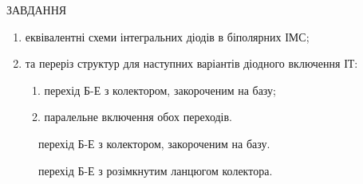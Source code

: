 \documentclass[a4paper,14pt]{extreport}
\begin{document}
\begin{center}ЗАВДАННЯ\end{center}

\begin{enumerate}
  \item еквівалентні схеми інтегральних діодів в біполярних ІМС;
  \item та переріз структур для наступних варіантів діодного включення ІТ:
  \begin{enumerate}
    \item перехід Б-Е з колектором, закороченим на базу;
    \item паралельне включення обох переходів.
  \end{enumerate}
\end{enumerate}

\begin{center}\end{center}

\begin{figure}[h]
  \caption{перехід Б-Е з колектором, закороченим на базу.}
  \label{ris1}
\end{figure}

\begin{figure}[h]
  \caption{перехід Б-Е з розімкнутим ланцюгом колектора.}
  \label{ris1}
\end{figure}
\end{document}
